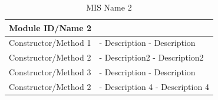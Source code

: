 \documentclass [10pt]{article}
\begin{document}
\begin{longtable}{| p{ } | p{ } | }\caption{MIS Name 2} \\\hline  
 \multicolumn{2}{|l|}{\textbf {Module ID/Name 2}}\\ \hline
\cellcolor{tableCell}Constructor/Method 1 & \cellcolor{tableCell}- Description \newline - Description  \\ \hline 

Constructor/Method 2 & - Description2 \newline - Description2  \\ \hline 

\cellcolor{tableCell}Constructor/Method 3 & \cellcolor{tableCell}- Description \newline - Description  
\\ \hline


Constructor/Method 2 & - Description 4 \newline - Description 4  \\ \hline
\end{longtable}













\end{document}
